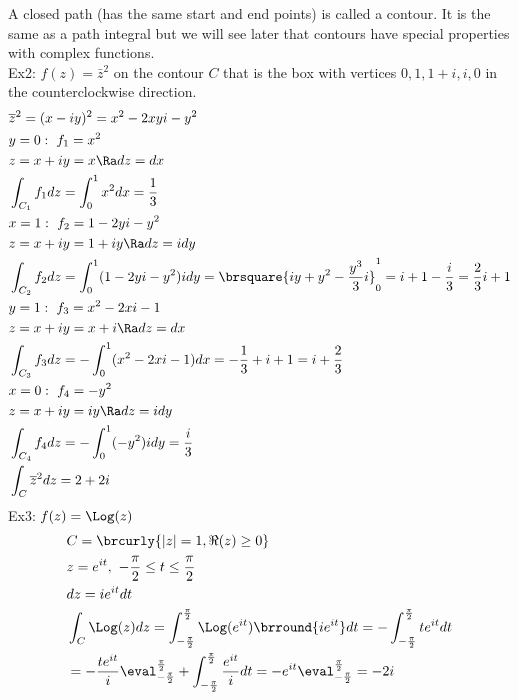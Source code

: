 A closed path (has the same start and end points) is called a contour. It is the same as a path integral but we will see later that contours have special properties with complex functions.\\
Ex2: $f(z)=\bar{z}^2$ on the contour $C$ that is the box with vertices $0,1,1+i,i,0$ in the counterclockwise direction.
\begin{align*}
    &\overline{z}^2=(x-iy)^2=x^2-2xyi-y^2\\
    &y=0:\ f_1=x^2\\
    &z=x+iy=x\Ra dz=dx\\
    &\int_{C_1}f_1dz=\int_0^1 x^2dx=\frac{1}{3}\\
    &x=1:\ f_2=1-2yi-y^2\\
    &z=x+iy=1+iy\Ra dz=idy\\
    &\int_{C_2}f_2dz=\int_0^1(1-2yi-y^2)idy=\brsquare{iy+y^2-\frac{y^3}{3}i}_0^1=i+1-\frac{i}{3}=\frac{2}{3}i+1\\
    &y=1:\ f_3=x^2-2xi-1\\
    &z=x+iy=x+i\Ra dz=dx\\
    &\int_{C_3}f_3dz=-\int_0^1(x^2-2xi-1)dx=-\frac{1}{3}+i+1=i+\frac{2}{3}\\
    &x=0:\ f_4=-y^2\\
    &z=x+iy=iy\Ra dz=idy\\
    &\int_{C_4}f_4dz=-\int_0^1(-y^2)idy=\frac{i}{3}\\
    &\int_C\overline{z}^2dz=2+2i
\end{align*}
Ex3: $f(z)=\Log(z)$
\begin{align*}
    &C=\brcurly{|z|=1,\Re(z)\geq0}\\
    &z=e^{it},\ -\frac{\pi}{2}\leq t\leq \frac{\pi}{2}\\
    &dz=ie^{it}dt\\
    &\int_C\Log(z)dz=\int_{-\frac{\pi}{2}}^{\frac{\pi}{2}}\Log(e^{it})\brround{ie^{it}}dt=-\int_{-\frac{\pi}{2}}^{\frac{\pi}{2}}te^{it}dt\\
    &=-\frac{te^{it}}{i}\eval_{-\frac{\pi}{2}}^{\frac{\pi}{2}}+\int_{-\frac{\pi}{2}}^{\frac{\pi}{2}}\frac{e^{it}}{i}dt=-e^{it}\eval_{-\frac{\pi}{2}}^{\frac{\pi}{2}}=-2i
\end{align*}
